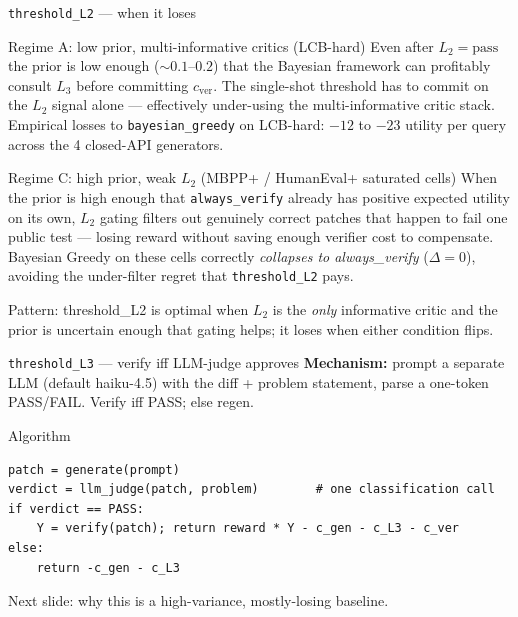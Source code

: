 \documentclass[10pt]{beamer}
\newcommand{\info}[1]{\textcolor{primaryBlue}{\textbf{#1}}}
\begin{document}
\begin{frame}[fragile]{\texttt{threshold\_L2} --- when it loses}
\begin{alertblock}{Regime A: low prior, multi-informative critics (LCB-hard)}
Even after $L_2{=}\text{pass}$ the prior is low enough ($\sim 0.1$--$0.2$)
that the Bayesian framework can profitably consult $L_3$ before committing
$c_\text{ver}$. The single-shot threshold has to commit on the $L_2$
signal alone --- effectively under-using the multi-informative critic
stack. \\[2pt]
Empirical losses to \texttt{bayesian\_greedy} on LCB-hard:
$-12$ to $-23$ utility per query across the 4 closed-API generators.
\end{alertblock}

\begin{alertblock}{Regime C: high prior, weak $L_2$ (MBPP+ / HumanEval+ saturated cells)}
When the prior is high enough that \texttt{always\_verify} already has
positive expected utility on its own, $L_2$ gating filters out genuinely
correct patches that happen to fail one public test --- losing reward
without saving enough verifier cost to compensate. \\[2pt]
Bayesian Greedy on these cells correctly \emph{collapses to
always\_verify} ($\Delta = 0$), avoiding the under-filter regret that
\texttt{threshold\_L2} pays.
\end{alertblock}

\textcolor{softGrey}{\scriptsize Pattern: threshold\_L2 is optimal when
$L_2$ is the \emph{only} informative critic and the prior is uncertain
enough that gating helps; it loses when either condition flips.}
\end{frame}

\begin{frame}[fragile]{\texttt{threshold\_L3} --- verify iff LLM-judge approves}
\info{Mechanism:} prompt a separate LLM (default haiku-4.5) with the diff +
problem statement, parse a one-token PASS/FAIL. Verify iff PASS; else regen.

\begin{block}{Algorithm}
\begin{lstlisting}
patch = generate(prompt)
verdict = llm_judge(patch, problem)        # one classification call
if verdict == PASS:
    Y = verify(patch); return reward * Y - c_gen - c_L3 - c_ver
else:
    return -c_gen - c_L3
\end{lstlisting}
\end{block}

\textcolor{softGrey}{\scriptsize Next slide: why this is a high-variance,
mostly-losing baseline.}
\end{frame}
\end{document}
